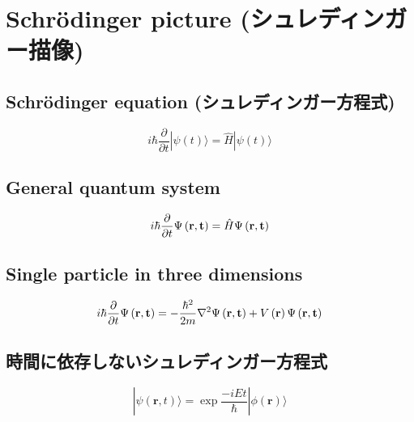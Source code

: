 \section{Schr\"odinger picture (シュレディンガー描像)}

\subsection{Schr\"odinger equation (シュレディンガー方程式)}

\begin{equation}
  i \hbar \frac{ \partial{} }{ \partial{}t } | \psi(t) \rangle = \hat{H} | \psi(t) \rangle
\end{equation}


\subsection{General quantum system}
\begin{equation}
  i\hbar \frac{ \partial }{ \partial t } \Psi \left( \bf{r} , t \right) = \hat{H} \Psi \left( \bf{r} , t \right)
\end{equation}


\subsection{Single particle in three dimensions}
\begin{equation}
  i\hbar \frac{ \partial }{ \partial t } \Psi \left( \bf{r} , t \right)
    = -\frac{{\hbar}^2}{2m} {\nabla}^2 \Psi \left( \bf{r} , t \right) + V \left( \bf{r} \right) \Psi \left( \bf{r} , t \right)
\end{equation}


\subsection{時間に依存しないシュレディンガー方程式}
\begin{equation}
  | \psi ( \mathbf{r} , t ) \rangle = \exp{ \frac{-iEt}{ \hbar }  } | \phi ( \mathbf{r} ) \rangle
\end{equation}
